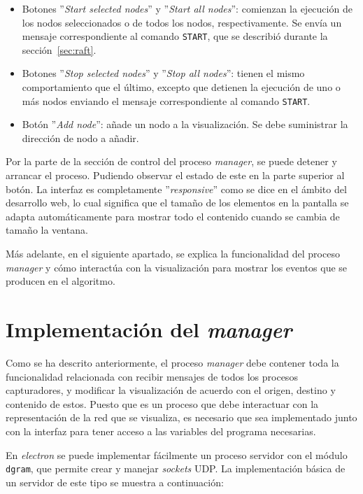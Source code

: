 \begin{itemize}
\item Botones ''\textit{Start selected nodes}'' y ''\textit{Start all nodes}'': comienzan la ejecución de los nodos seleccionados o de todos los nodos, respectivamente. Se envía un mensaje correspondiente al comando \texttt{START}, que se describió durante la sección~\ref{sec:raft}.

\item Botones ''\textit{Stop selected nodes}'' y ''\textit{Stop all nodes}'': tienen el mismo comportamiento que el último, excepto que detienen la ejecución de uno o más nodos enviando el mensaje correspondiente al comando \texttt{START}.

\item Botón ''\textit{Add node}'': añade un nodo a la visualización. Se debe suministrar la dirección de nodo a añadir.
\end{itemize}

Por la parte de la sección de control del proceso \textit{manager}, se puede detener y arrancar el proceso. Pudiendo observar el estado de este en la parte superior al botón. La interfaz es completamente ''\textit{responsive}'' como se dice en el ámbito del desarrollo web, lo cual significa que el tamaño de los elementos en la pantalla se adapta automáticamente para mostrar todo el contenido cuando se cambia de tamaño la ventana.

Más adelante, en el siguiente apartado, se explica la funcionalidad del proceso \textit{manager} y cómo interactúa con la visualización para mostrar los eventos que se producen en el algoritmo. 

\section{Implementación del \textit{manager}}

Como se ha descrito anteriormente, el proceso \textit{manager} debe contener toda la funcionalidad relacionada con recibir mensajes de todos los procesos capturadores, y modificar la visualización de acuerdo con el origen, destino y contenido de estos. Puesto que es un proceso que debe interactuar con la representación de la red que se visualiza, es necesario que sea implementado junto con la interfaz para tener acceso a las variables del programa necesarias.

En \textit{electron} se puede implementar fácilmente un proceso servidor con el módulo \texttt{dgram}, que permite crear y manejar \textit{sockets} UDP. La implementación básica de un servidor de este tipo se muestra a continuación:


